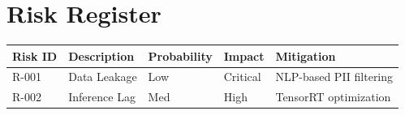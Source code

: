 \documentclass[
]{report}
\author{}
\date{}
\newcounter{none} %
\begin{document}
\newcommand{\theProjectName}{NOAA}
\newcommand{\theAuthor}{Rodrigo Souza dos Santos}

\chapter{Risk Register}\label{risk-register}

{\def\LTcaptype{none} %
\begin{longtable}[]{@{}lllll@{}}
\toprule\noalign{}
Risk ID & Description & Probability & Impact & Mitigation \\
\midrule\noalign{}
\endhead
\bottomrule\noalign{}
\endlastfoot
R-001 & Data Leakage & Low & Critical & NLP-based PII filtering \\
R-002 & Inference Lag & Med & High & TensorRT optimization \\
\end{longtable}
}
\end{document}

